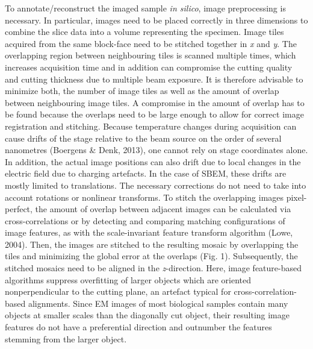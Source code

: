 \documentclass{article}
\begin{document}
To annotate/reconstruct the imaged sample \emph{in silico}, image preprocessing is necessary. In particular, images need to be placed correctly in three dimensions to combine the slice data into a volume representing the specimen. Image tiles acquired from the same block-face need to be stitched together in \emph{x} and \emph{y}. The overlapping region between neighbouring tiles is scanned multiple times, which increases acquisition time and in addition can compromise the cutting quality and cutting thickness due to multiple beam exposure. It is therefore advisable to minimize both, the number of image tiles as well as the amount of overlap between neighbouring image tiles. A compromise in the amount of overlap has to be found because the overlaps need to be large enough to allow for correct image registration and stitching. Because temperature changes during acquisition can cause drifts of the stage relative to the beam source on the order of several nanometres (Boergens \& Denk, 2013), one cannot rely on stage coordinates alone. In addition, the actual image positions can also drift due to local changes in the electric field due to charging artefacts. In the case of SBEM, these drifts are mostly limited to translations. The necessary corrections do not need to take into account rotations or nonlinear transforms. To stitch the overlapping images pixel-perfect, the amount of overlap between adjacent images can be calculated via cross-correlations or by detecting and comparing matching configurations of image features, as with the scale-invariant feature transform algorithm (Lowe, 2004). Then, the images are stitched to the resulting mosaic by overlapping the tiles and minimizing the global error at the overlaps (Fig. 1). Subsequently, the stitched mosaics need to be aligned in the \emph{z}-direction. Here, image feature-based algorithms suppress overfitting of larger objects which are oriented nonperpendicular to the cutting plane, an artefact typical for cross-correlation-based alignments. Since EM images of most biological samples contain many objects at smaller scales than the diagonally cut object, their resulting image features do not have a preferential direction and outnumber the features stemming from the larger object.
\end{document}

